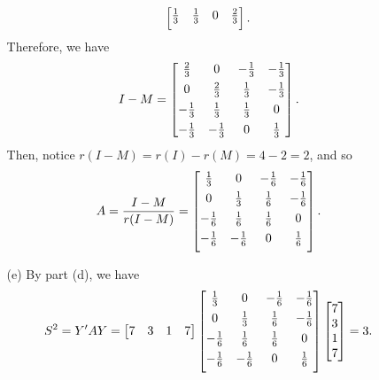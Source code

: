 \documentclass[11pt]{article}
\begin{document}
\begin{itemize}
\begin{itemize}
\[\begin{bmatrix}
\frac{1}{3} & \frac{1}{3} \vspace{1.5mm}& 0 & \frac{2}{3}
\end{bmatrix}.
\]
Therefore, we have
\[
I - M = \begin{bmatrix}
\frac{2}{3} & 0 & -\frac{1}{3} \vspace{1.5mm} & -\frac{1}{3} \\
0 & \frac{2}{3} & \frac{1}{3} \vspace{1.5mm} & -\frac{1}{3} \\
-\frac{1}{3} & \frac{1}{3} \vspace{1.5mm} & \frac{1}{3} & 0 \\
-\frac{1}{3} & -\frac{1}{3} & 0 & \frac{1}{3}
\end{bmatrix}.
\]
Then, notice $r(I-M) = r(I) - r(M) = 4 - 2 = 2$, and so
\[
A = \frac{I-M}{r(I-M)} = \begin{bmatrix}
\frac{1}{3} & 0 & -\frac{1}{6} \vspace{1.5mm}& -\frac{1}{6} \\
0 & \frac{1}{3} & \frac{1}{6} \vspace{1.5mm}& -\frac{1}{6} \\
-\frac{1}{6} & \frac{1}{6} & \frac{1}{6} \vspace{1.5mm}& 0 \\
-\frac{1}{6} \vspace{1.5mm}& -\frac{1}{6} & 0 & \frac{1}{6}
\end{bmatrix}.
\]
\item[(e)]  By part (d), we have
\[
S^2 = Y'AY = \begin{bmatrix}
7 & 3 & 1 & 7
\end{bmatrix}\begin{bmatrix}
\frac{1}{3} & 0 & -\frac{1}{6} \vspace{1.5mm}& -\frac{1}{6} \\
0 & \frac{1}{3} & \frac{1}{6} \vspace{1.5mm}& -\frac{1}{6} \\
-\frac{1}{6} & \frac{1}{6} & \frac{1}{6} \vspace{1.5mm}& 0 \\
-\frac{1}{6} \vspace{1.5mm}& -\frac{1}{6} & 0 & \frac{1}{6}
\end{bmatrix}\begin{bmatrix}
7 \\ 3 \\ 1 \\ 7
\end{bmatrix} = 3.
\]
\end{itemize}
\end{itemize}
\end{document}
